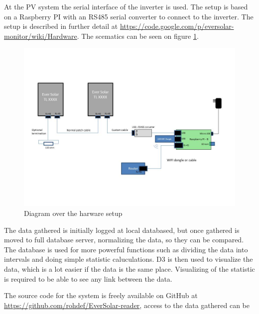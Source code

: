 At the PV system the serial interface of the inverter is used.  The
setup is based on a Raspberry PI with an RS485 serial converter to
connect to the inverter.  The setup is described in further detail at
\url{https://code.google.com/p/eversolar-monitor/wiki/Hardware}.  The
scematics can be seen on figure \ref{fig:hardware}.

\begin{figure}[h]
  \centering
  \includegraphics{hardware.jpg}
  \caption{Diagram over the harware setup}
  \label{fig:hardware}
\end{figure}

The data gathered is initially logged at local databased, but once
gathered is moved to full database server, normalizing the data, so
they can be compared.  The database is used for more powerful
functions such as dividing the data into intervals and doing simple
statistic caluculations.
D3 is then used to visualize the data, which is a lot easier if the data 
is the same place. Visualizing of the statistic is required to be able to 
see any link between the data.


The source code for the system is freely available on GitHub at
\url{https://github.com/rohdef/EverSolar-reader}, access to the data
gathered can be


